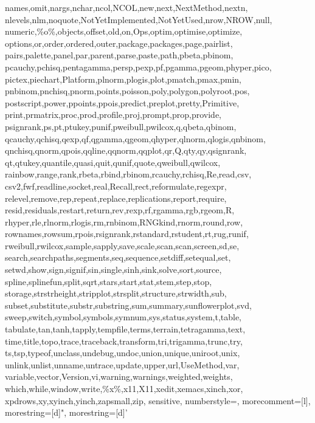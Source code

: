 {{      names,omit,nargs,nchar,ncol,NCOL,new,next,NextMethod,nextn,
      nlevels,nlm,noquote,NotYetImplemented,NotYetUsed,nrow,NROW,null,
      numeric,\%o\%,objects,offset,old,on,Ops,optim,optimise,optimize,
      options,or,order,ordered,outer,package,packages,page,pairlist,
      pairs,palette,panel,par,parent,parse,paste,path,pbeta,pbinom,
      pcauchy,pchisq,pentagamma,persp,pexp,pf,pgamma,pgeom,phyper,pico,
      pictex,piechart,Platform,plnorm,plogis,plot,pmatch,pmax,pmin,
      pnbinom,pnchisq,pnorm,points,poisson,poly,polygon,polyroot,pos,
      postscript,power,ppoints,ppois,predict,preplot,pretty,Primitive,
      print,prmatrix,proc,prod,profile,proj,prompt,prop,provide,
      psignrank,ps,pt,ptukey,punif,pweibull,pwilcox,q,qbeta,qbinom,
      qcauchy,qchisq,qexp,qf,qgamma,qgeom,qhyper,qlnorm,qlogis,qnbinom,
      qnchisq,qnorm,qpois,qqline,qqnorm,qqplot,qr,Q,qty,qy,qsignrank,
      qt,qtukey,quantile,quasi,quit,qunif,quote,qweibull,qwilcox,
      rainbow,range,rank,rbeta,rbind,rbinom,rcauchy,rchisq,Re,read,csv,
      csv2,fwf,readline,socket,real,Recall,rect,reformulate,regexpr,
      relevel,remove,rep,repeat,replace,replications,report,require,
      resid,residuals,restart,return,rev,rexp,rf,rgamma,rgb,rgeom,R,
      rhyper,rle,rlnorm,rlogis,rm,rnbinom,RNGkind,rnorm,round,row,
      rownames,rowsum,rpois,rsignrank,rstandard,rstudent,rt,rug,runif,
      rweibull,rwilcox,sample,sapply,save,scale,scan,scan,screen,sd,se,
      search,searchpaths,segments,seq,sequence,setdiff,setequal,set,
      setwd,show,sign,signif,sin,single,sinh,sink,solve,sort,source,
      spline,splinefun,split,sqrt,stars,start,stat,stem,step,stop,
      storage,strstrheight,stripplot,strsplit,structure,strwidth,sub,
      subset,substitute,substr,substring,sum,summary,sunflowerplot,svd,
      sweep,switch,symbol,symbols,symnum,sys,status,system,t,table,
      tabulate,tan,tanh,tapply,tempfile,terms,terrain,tetragamma,text,
      time,title,topo,trace,traceback,transform,tri,trigamma,trunc,try,
      ts,tsp,typeof,unclass,undebug,undoc,union,unique,uniroot,unix,
      unlink,unlist,unname,untrace,update,upper,url,UseMethod,var,
      variable,vector,Version,vi,warning,warnings,weighted,weights,
      which,while,window,write,\%x\%,x11,X11,xedit,xemacs,xinch,xor,
      xpdrows,xy,xyinch,yinch,zapsmall,zip},
   sensitive,
   numberstyle=\tiny\color{codegray},
   morecomment=[l],
   morestring=[d]",
   morestring=[d]'
  }


